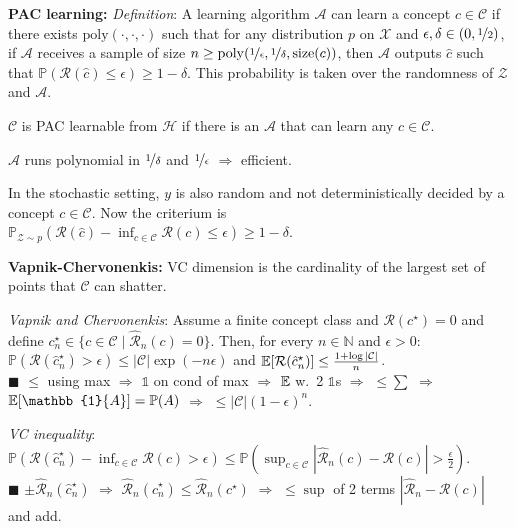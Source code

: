 \documentclass[9pt]{extarticle}
\newenvironment{topic}[1]
{\textbf{\sffamily \colorbox{black}{\rlap{\textbf{\textcolor{white}{#1}}}\hspace{\linewidth}\hspace{-2\fboxsep}}}}
{}
\newenvironment{subtopic}[1]
{\textbf{\sffamily #1:}}
{}
\begin{document}
\begin{multicols*}{3}
\begin{topic}{Statistical learning theory}
\begin{subtopic}{PAC learning}
            \textit{Definition}: A learning algorithm $\mathcal{A}$ can learn a concept $c \in
                \mathcal{C}$ if there exists $\mathrm{poly}(\cdot, \cdot, \cdot)$ such that for any
            distribution $p$ on $\mathcal{X}$ and $\epsilon,\delta \in (0,\nicefrac{1}{2})$, if
            $\mathcal{A}$ receives a sample of size $n \geq \mathrm{poly}(\nicefrac{1}{\epsilon},
                \nicefrac{1}{\delta}, \mathrm{size}(c))$, then $\mathcal{A}$ outputs $\hat{c}$ such
            that $\mathbb{P}(\mathcal{R}(\hat{c}) \leq \epsilon) \geq 1-\delta$.
            This probability is taken over the randomness of $\mathcal{Z}$ and $\mathcal{A}$.

            $\mathcal{C}$ is PAC learnable from $\mathcal{H}$ if there is an $\mathcal{A}$ that can learn any $c \in \mathcal{C}$.

            $\mathcal{A}$ runs polynomial in $\nicefrac{1}{\delta}$ and $\nicefrac{1}{\epsilon}$ $\Rightarrow$
            efficient.

            In the stochastic setting, $y$ is also random and not deterministically decided by a concept $c \in
                \mathcal{C}$. Now the criterium is $\mathbb{P}_{\mathcal{Z} \sim p}(\mathcal{R}(\hat{c}) - \inf_{c
                    \in \mathcal{C}} \mathcal{R}(c) \leq \epsilon) \geq 1-\delta$.

        \end{subtopic}

        \begin{subtopic}{Vapnik-Chervonenkis}
            VC dimension is the cardinality of the largest set of points that $\mathcal{C}$ can shatter.

            \textit{Vapnik and Chervonenkis}: Assume a finite concept class and $\mathcal{R}(c^\star) = 0$ and define
            $c_n^\star \in \{ c \in \mathcal{C} \mid \hat{\mathcal{R}}_n(c) = 0 \}$. Then, for every $n \in
                \mathbb{N}$ and $\epsilon > 0$: $\mathbb{P}(\mathcal{R}(\hat{c}^\star_n) > \epsilon) \leq |\mathcal{C}| \exp(-n \epsilon)$ and $\mathbb{E}[\mathcal{R}(\hat{c}_n^\star)] \leq \frac{1 + \log |\mathcal{C}|}{n}$. \\
            $\blacksquare$ $\leq$ using max $\Rightarrow$ $\mathbb{1}$ on cond of max $\Rightarrow$ $\mathbb{E}$ w.\ 2 $\mathbb{1}$s $\Rightarrow$ $\leq \sum$ $\Rightarrow$ $\E[\mathbb{1}\{ A \}] = \mathbb{P}(A)$ $\Rightarrow$ $\leq |\mathcal{C}|(1-\epsilon)^n$.

            \textit{VC inequality}: $\mathbb{P}(\mathcal{R}(\hat{c}_n^\star) - \inf_{c \in \mathcal{C}} \mathcal{R}(c) > \epsilon) \leq \mathbb{P}(\sup_{c \in \mathcal{C}} |\hat{\mathcal{R}}_n(c) - \mathcal{R}(c)| > \frac{\epsilon}{2})$. \\
            $\blacksquare$ $\pm \hat{\mathcal{R}}_n(\hat{c}_n^\star)$ $\Rightarrow$ $\hat{\mathcal{R}}_n(\hat{c}_n^\star) \leq \hat{\mathcal{R}}_n(c^\star)$ $\Rightarrow$ $\leq \sup$ of 2 terms $|\hat{\mathcal{R}}_n - \mathcal{R}(c)|$ and add.


\end{subtopic}
\end{topic}
\end{multicols*}
\end{document}
